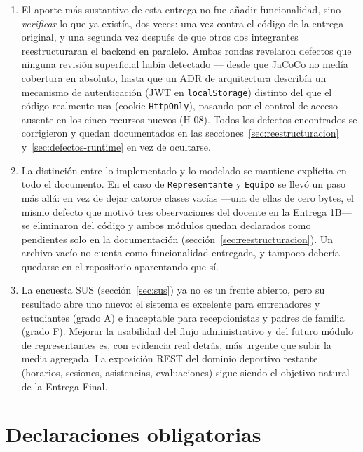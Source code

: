 \documentclass[11pt,a4paper]{article}
\begin{document}
\begin{enumerate}[leftmargin=*]
  \item El aporte más sustantivo de esta entrega no fue añadir
    funcionalidad, sino \emph{verificar} lo que ya existía, dos veces: una
    vez contra el código de la entrega original, y una segunda vez después
    de que otros dos integrantes reestructuraran el backend en paralelo.
    Ambas rondas revelaron defectos que ninguna revisión superficial había
    detectado — desde que JaCoCo no medía cobertura en absoluto, hasta que
    un ADR de arquitectura describía un mecanismo de autenticación
    (JWT en \texttt{localStorage}) distinto del que el código realmente usa
    (cookie \texttt{HttpOnly}), pasando por el control de acceso ausente en
    los cinco recursos nuevos (H-08). Todos los defectos encontrados se
    corrigieron y quedan documentados en las
    secciones~\ref{sec:reestructuracion} y~\ref{sec:defectos-runtime} en vez
    de ocultarse.

  \item La distinción entre lo implementado y lo modelado se mantiene
    explícita en todo el documento. En el caso de \texttt{Representante} y
    \texttt{Equipo} se llevó un paso más allá: en vez de dejar catorce
    clases vacías —una de ellas de cero bytes, el mismo defecto que motivó
    tres observaciones del docente en la Entrega 1B— se eliminaron del
    código y ambos módulos quedan declarados como pendientes solo en la
    documentación (sección~\ref{sec:reestructuracion}). Un archivo vacío no
    cuenta como funcionalidad entregada, y tampoco debería quedarse en el
    repositorio aparentando que sí.

  \item La encuesta SUS (sección~\ref{sec:sus}) ya no es un frente abierto,
    pero su resultado abre uno nuevo: el sistema es excelente para
    entrenadores y estudiantes (grado A) e inaceptable para recepcionistas
    y padres de familia (grado F). Mejorar la usabilidad del flujo
    administrativo y del futuro módulo de representantes es, con evidencia
    real detrás, más urgente que subir la media agregada. La exposición
    REST del dominio deportivo restante (horarios, sesiones, asistencias,
    evaluaciones) sigue siendo el objetivo natural de la Entrega Final.
\end{enumerate}

\section{Declaraciones obligatorias}
\label{sec:declaraciones}
\end{document}
